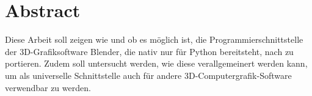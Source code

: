 \section*{Abstract}

Diese Arbeit soll zeigen wie und ob es möglich ist, die Programmierschnittstelle der 3D-Grafiksoftware Blender, die nativ nur für Python bereitsteht, nach \CS zu portieren. Zudem soll untersucht werden, wie diese verallgemeinert werden kann, um als universelle Schnittstelle auch für andere 3D-Computergrafik-Software verwendbar zu werden.
